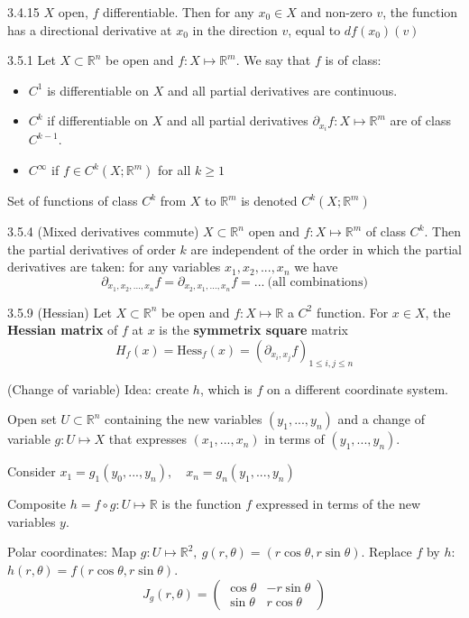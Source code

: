 \documentclass[8pt,a4paper,twocolumn,table]{extarticle}
\newcommand{\R}{\mathbb{R}}
\begin{document}
\begin{proposition}{3.4.15}
    $X$ open, $f$ differentiable. Then for any $x_0 \in X$ and non-zero $v$, the function has
    a directional derivative at $x_0$ in the direction $v$, equal to $df(x_0)(v)$
\end{proposition}

\begin{definition}{3.5.1}
    Let $X \subset \R^n$ be open and $f: X \mapsto \R^m$.
    We say that $f$ is of class:
    \begin{itemize}
        \item $C^1$ is differentiable on $X$ and all partial derivatives are continuous.
        \item $C^k$ if differentiable on $X$ and all partial derivatives $\partial_{x_i}f: X \mapsto \R^m$ are of class $C^{k-1}$.
        \item $C^\infty$ if $f \in C^k(X;\R^m)$ for all $k \ge 1$
    \end{itemize}
    Set of functions of class $C^k$ from $X$ to $\R^m$ is denoted $C^k(X; \R^m)$
\end{definition}

\begin{proposition}{3.5.4 (Mixed derivatives commute)}
    $X \subset \R^n$ open and $f: X \mapsto \R^m$ of class $C^k$. Then the partial derivatives
    of order $k$ are independent of the order in which the partial derivatives are taken: for any variables
    $x_1, x_2, ..., x_n$ we have
    \[ \partial_{x_1, x_2, ..., x_n}f = \partial_{x_2, x_1, ..., x_n}f = ...   \ \mbox{(all combinations)}\]
\end{proposition}

\begin{definition}{3.5.9 (Hessian)}
    Let $X \subset \R^n$ be open and $f: X \mapsto \R$ a $C^2$ function.
    For $x \in X$, the \textbf{Hessian matrix} of $f$ at $x$ is the \textbf{symmetrix square} matrix
    \[ \mathit{H}_f(x) = \mathrm{Hess}_f(x) = (\partial_{x_i, x_j}f)_{1 \le i, j \le n} \]
\end{definition}

\begin{example}{(Change of variable)}
    Idea: create $h$, which is $f$ on a different coordinate system.

    Open set $U \subset \R^n$ containing the new variables $(y_1, ..., y_n)$ and a change of variable $g: U \mapsto X$
    that expresses $(x_1, ..., x_n)$ in terms of $(y_1, ..., y_n)$.

    Consider $x_1 = g_1(y_0, ..., y_n),\quad x_n = g_n(y_1, ..., y_n)$

    Composite $h = f \circ g: U \mapsto \R$ is the function $f$ expressed in terms of the new variables $y$.

    Polar coordinates: Map $g: U \mapsto \R^2,\ g(r, \theta) = (r \cos \theta, r \sin \theta)$.
    Replace $f$ by $h$: $h(r, \theta) = f(r \cos \theta, r \sin \theta)$.
    \[ J_g(r, \theta) = \begin{pmatrix}
            \cos \theta & - r \sin \theta \\
            \sin \theta & r \cos \theta
        \end{pmatrix} \]
\end{example}
\end{document}
